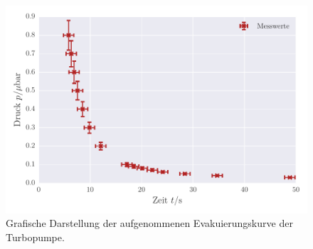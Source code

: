 \begin{figure}[!h]
 \centering
 \includegraphics[scale=0.8]{../Grafiken/Evakuierungskurve_Turbo_exp.pdf}
 \caption{Grafische Darstellung der aufgenommenen Evakuierungskurve der Turbopumpe.\label{fig:evakuierungskurve_turbo_exp}}
 \end{figure} 
